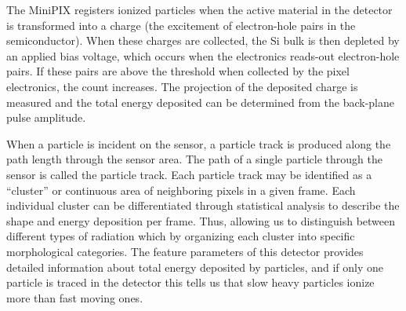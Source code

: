 The MiniPIX registers ionized particles when the active material in the detector is transformed into a charge (the excitement of electron-hole pairs in the semiconductor). When these charges are collected, the Si bulk is then depleted by an applied bias voltage, which occurs when the electronics reads-out electron-hole pairs. If these pairs are above the threshold when collected by the pixel electronics, the count increases. The projection of the deposited charge is measured and the total energy deposited can be determined from the back-plane pulse amplitude. 

When a particle is incident on the sensor, a particle track is produced along the path length through the sensor area. The path of a single particle through the sensor is called the particle track.  Each particle track may be identified as a ``cluster'' or continuous area of neighboring pixels in a given frame. Each individual cluster can be differentiated through statistical analysis to describe the shape and energy deposition per frame. Thus, allowing us to distinguish between different types of radiation which by organizing each cluster into specific morphological categories. The feature parameters of this detector provides detailed information about total energy deposited by particles, and if only one particle is traced in the detector this tells us that slow heavy particles ionize more than fast moving ones. 

